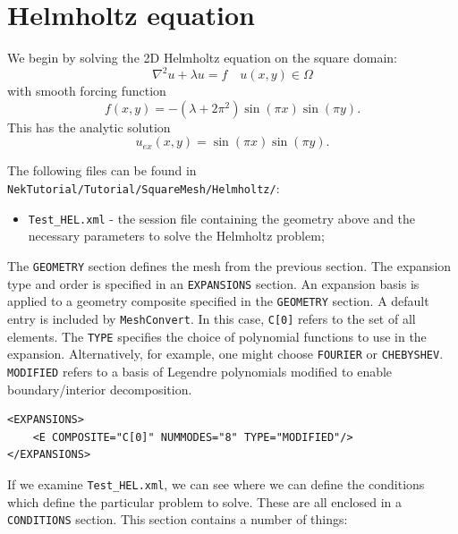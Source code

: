 \documentclass[a4paper,12pt]{article}
\begin{document}
\clearpage
\section{Helmholtz equation}

We begin by solving the 2D Helmholtz equation on the square domain:
\begin{equation}
\nabla^2 u + \lambda u = f \quad u(x,y) \in \Omega
\end{equation}
with smooth forcing function
\begin{equation}
f(x,y)= -(\lambda + 2\pi^2)\sin(\pi x)\sin(\pi y).
\end{equation}
This has the analytic solution
\begin{equation}
u_{ex}(x,y)= \sin(\pi x)\sin(\pi y).
\end{equation}
 
The following files can be found in
\texttt{NekTutorial/Tutorial/SquareMesh/Helmholtz/}:
 \begin{itemize}
 \item \texttt{Test\_HEL.xml} - the \nektar session file containing
 the geometry above and the necessary parameters to solve the Helmholtz problem;
 \end{itemize} 

The \texttt{GEOMETRY} section defines the mesh from the previous section. The
expansion type and order is specified in an \texttt{EXPANSIONS} section. An
expansion basis is applied to a geometry composite specified in the
\texttt{GEOMETRY} section. A default entry is included by \texttt{MeshConvert}.
In this case, \texttt{C[0]} refers to the set of all elements. The \texttt{TYPE}
specifies the choice of polynomial functions to use in the expansion.
Alternatively, for example, one might choose \texttt{FOURIER} or
\texttt{CHEBYSHEV}. \texttt{MODIFIED} refers to a basis of Legendre polynomials
modified to enable boundary/interior decomposition.

\begin{verbatim}
<EXPANSIONS>
    <E COMPOSITE="C[0]" NUMMODES="8" TYPE="MODIFIED"/>
</EXPANSIONS>
\end{verbatim}

If we examine \texttt{Test\_HEL.xml}, we can see where we can define the
conditions which define the particular problem to solve. These are all enclosed
in a \texttt{CONDITIONS} section. This section contains a number of things:
\end{document}
